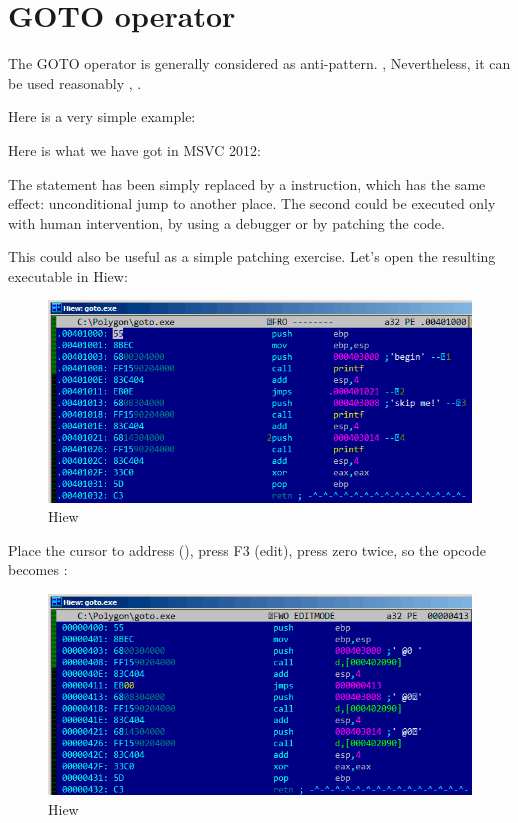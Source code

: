 \chapter{GOTO operator}

The GOTO operator is generally considered as anti-pattern. 
\cite{Dijkstra:1968:LEG:362929.362947}, 
Nevertheless, it can be used reasonably \cite{Knuth:1974:SPG:356635.356640}, \cite[1.3.2]{CBook}.

Here is a very simple example:



Here is what we have got in MSVC 2012:



The  statement has been simply replaced by a \JMP instruction, which has the same effect: unconditional jump to another place.
The second \printf could be executed only with human intervention, by using a debugger or by patching the code.

\par

\ifdefined\IncludeHiew
\clearpage

This could also be useful as a simple patching exercise. Let's open the resulting executable in Hiew:

\begin{figure}[H]
\centering
\includegraphics[scale=\FigScale]{patterns/065_GOTO/hiew1.png}
\caption{Hiew}
\label{fig:goto_hiew1}
\end{figure}

\clearpage
Place the cursor to address \JMP (), 
press F3 (edit), press zero twice, so the opcode becomes :

\begin{figure}[H]
\centering
\includegraphics[scale=\FigScale]{patterns/065_GOTO/hiew2.png}
\caption{Hiew}
\label{fig:goto_hiew2}
\end{figure}

